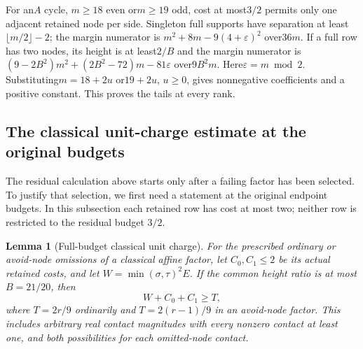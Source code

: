 \documentclass[11pt]{article}
\newtheorem{lemma}[theorem]{Lemma}
\theoremstyle{remark}\newtheorem{remark}[theorem]{Remark}
\begin{document}
For an$A$ cycle, $m\ge18$ even or$m\ge19$ odd, cost at most$3/2$
permits only one adjacent retained node per side. Singleton full
supports have separation at least$\lfloor m/2\rfloor-2$;
the margin numerator is
$m^2+8m-9(4+\varepsilon)^2$ over$36m$.
If a full row has two nodes, its height is at least$2/B$ and the
margin numerator is
$(9-2B^2)m^2+(2B^2-72)m-81\varepsilon$ over$9B^2m$.
Here$\varepsilon=m\bmod2$. Substituting$m=18+2u$ or$19+2u$,
$u\ge0$, gives nonnegative coefficients and a positive constant.
This proves the tails at every rank.

\subsection{The classical unit-charge estimate at the original budgets}
\label{app:full-budget-classical}

The residual calculation above starts only after a failing factor has
been selected. To justify that selection, we first need a statement at
the original endpoint budgets. In this subsection each retained row has
cost at most two; neither row is restricted to the residual budget
$3/2$.

\begin{lemma}[Full-budget classical unit charge]
\label{lem:full-budget-classical-unit}
For the prescribed ordinary or avoid-node omissions of a classical
affine factor, let $C_0,C_1\le2$ be its actual retained costs, and let
$W=\min(\sigma,\tau)^2E$. If the common height ratio is at most
$B=21/20$, then
\[
 W+C_0+C_1\ge T,
\]
where $T=2r/9$ ordinarily and $T=2(r-1)/9$ in an avoid-node factor.
This includes arbitrary real contact magnitudes with every nonzero
contact at least one, and both possibilities for each omitted-node
contact.
\end{lemma}
\end{document}
